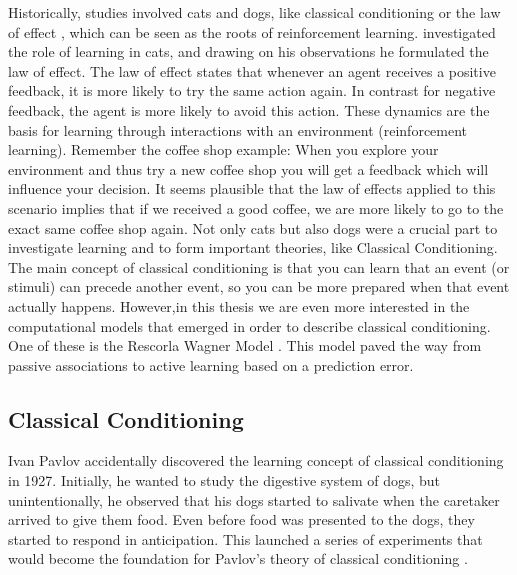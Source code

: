 Historically, studies involved cats and dogs, like classical conditioning \citep{pavlov1927conditional} or the law of effect \citep{thorndike1927law}, which can be seen as the roots of reinforcement learning. 
\citet{thorndike1927law} investigated the role of learning in cats, and drawing on his observations he formulated the law of effect.
The law of effect states that whenever an agent receives a positive feedback, it is more likely to try the same action again. In contrast for negative feedback, the agent is more likely to avoid this action.
These dynamics are the basis for learning through interactions with an environment (reinforcement learning). Remember the coffee shop example: When you explore your environment and thus try a new coffee shop you will get a feedback which will influence your decision. It seems plausible that the law of effects applied to this scenario implies that if we received a good coffee, we are more likely to go to the exact same coffee shop again. 
Not only cats but also dogs were a crucial part to investigate learning and to form important theories, like Classical Conditioning. 
The main concept of classical conditioning is that you can learn that an event (or stimuli) can precede another event, so you can be more prepared when that event actually happens. However,in this thesis we are even more interested in the computational models that emerged in order to describe classical conditioning. One of these is the Rescorla Wagner Model \citep{rescorla1972theory}. This model paved the way from passive associations to active learning based on a prediction error.

\subsection{Classical Conditioning}
Ivan Pavlov accidentally discovered the learning concept of classical conditioning in 1927. Initially, he wanted to study the digestive system of dogs, but unintentionally, he observed that his dogs started to salivate when the caretaker arrived to give them food. Even before food was presented to the dogs, they started to respond in anticipation. This launched a series of experiments that would become the foundation for Pavlov's theory of classical conditioning \citep{pavlov1927conditional}.  

